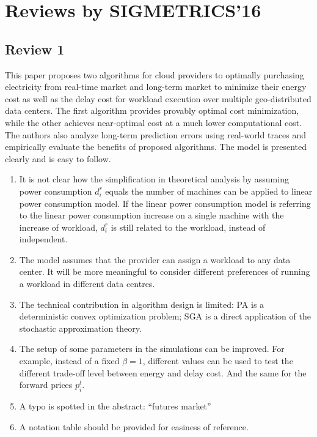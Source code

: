 \section{Reviews by SIGMETRICS'16}

\subsection{Review 1}
This paper proposes two algorithms for cloud providers to optimally purchasing electricity from real-time market and long-term market to minimize their energy cost as well as the delay cost for workload execution over multiple geo-distributed data centers. The first algorithm provides provably optimal cost minimization, while the other achieves near-optimal cost at a much lower computational cost. The authors also analyze long-term prediction errors using real-world traces and empirically evaluate the benefits of proposed algorithms. The model is presented clearly and is easy to follow.
\begin{enumerate}
	\item It is not clear how the simplification in theoretical analysis by assuming power consumption $d_i^r$ equals the number of machines can be applied to linear power consumption model. If the linear power consumption model is referring to the linear power consumption increase on a single machine with the increase of workload, $d_i^r$ is still related to the workload, instead of independent. 
	
	\item  The model assumes that the provider can assign a workload to any data center. It will be more meaningful to consider different preferences of running a workload in different data centres. 
	
	\item The technical contribution in algorithm design is limited: PA is a deterministic convex optimization problem; SGA is a direct application of the stochastic approximation theory. 
	
	\item The setup of some parameters in the simulations can be improved. For example, instead of a fixed $\beta=1$, different values can be used to test the different trade-off level between energy and delay cost. And the same for the forward prices $p_i^l$. 
	
	\item A typo is spotted in the abstract: ``futures market'' 
	
	\item A notation table should be provided for easiness of reference. 
\end{enumerate}


